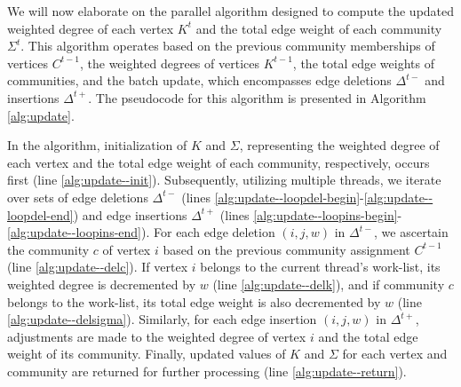 We will now elaborate on the parallel algorithm designed to compute the updated weighted degree of each vertex $K^t$ and the total edge weight of each community $\Sigma^t$. This algorithm operates based on the previous community memberships of vertices $C^{t-1}$, the weighted degrees of vertices $K^{t-1}$, the total edge weights of communities, and the batch update, which encompasses edge deletions $\Delta^{t-}$ and insertions $\Delta^{t+}$. The pseudocode for this algorithm is presented in Algorithm \ref{alg:update}.

In the algorithm, initialization of $K$ and $\Sigma$, representing the weighted degree of each vertex and the total edge weight of each community, respectively, occurs first (line \ref{alg:update--init}). Subsequently, utilizing multiple threads, we iterate over sets of edge deletions $\Delta^{t-}$ (lines \ref{alg:update--loopdel-begin}-\ref{alg:update--loopdel-end}) and edge insertions $\Delta^{t+}$ (lines \ref{alg:update--loopins-begin}-\ref{alg:update--loopins-end}). For each edge deletion $(i, j, w)$ in $\Delta^{t-}$, we ascertain the community $c$ of vertex $i$ based on the previous community assignment $C^{t-1}$ (line \ref{alg:update--delc}). If vertex $i$ belongs to the current thread's work-list, its weighted degree is decremented by $w$ (line \ref{alg:update--delk}), and if community $c$ belongs to the work-list, its total edge weight is also decremented by $w$ (line \ref{alg:update--delsigma}). Similarly, for each edge insertion $(i, j, w)$ in $\Delta^{t+}$, adjustments are made to the weighted degree of vertex $i$ and the total edge weight of its community. Finally, updated values of $K$ and $\Sigma$ for each vertex and community are returned for further processing (line \ref{alg:update--return}).


